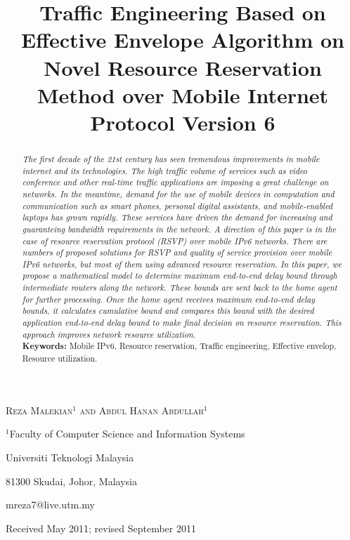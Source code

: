 \documentclass[12pt,a4paper]{ijicic}
\title[Traffic Engineering on a Novel resource reservation over Mobile IPv6]
      {Traffic Engineering Based on Effective Envelope Algorithm on Novel Resource Reservation Method over Mobile Internet Protocol Version 6}
\author[R. Malekian and A. H. Abdullah]{}
\begin{document}
\maketitle

\centerline{\scshape  Reza Malekian$^1$ and  Abdul Hanan Abdullah$^1$}
 \medskip
{\footnotesize
\centerline{$^1$Faculty of Computer Science and Information Systems}
\centerline{Universiti Teknologi Malaysia}
\centerline{81300 Skudai, Johor, Malaysia}
\centerline{mreza7@live.utm.my} }
\medskip




\centerline{Received May 2011; revised September 2011}


\medskip



\begin{abstract}

{\em The first decade of the 21st century has seen tremendous improvements in mobile internet and its technologies. The high traffic volume of services such as video conference and other real-time traffic applications are imposing a great challenge on networks. In the meantime, demand for the use of mobile devices in computation and communication such as smart phones, personal digital assistants, and mobile-enabled laptops has grown rapidly. These services have driven the demand for increasing and guaranteing bandwidth requirements in the network. A direction of this paper is in the case of resource reservation protocol (RSVP) over mobile IPv6 networks. There are numbers of proposed solutions for RSVP and quality of service provision over mobile IPv6 networks, but most of them using advanced resource reservation. In this paper, we propose a mathematical model to determine maximum end-to-end delay bound through intermediate routers along the network. These bounds are sent back to the home agent for further processing. Once the home agent receives maximum end-to-end delay bounds, it calculates cumulative bound and compares this bound with the desired application end-to-end delay bound to make final decision on resource reservation. This approach improves network resource utilization. }\\
{\bf Keywords:} Mobile IPv6, Resource reservation, Traffic engineering, Effective envelop, Resource utilization.

\end{abstract}
\end{document}
